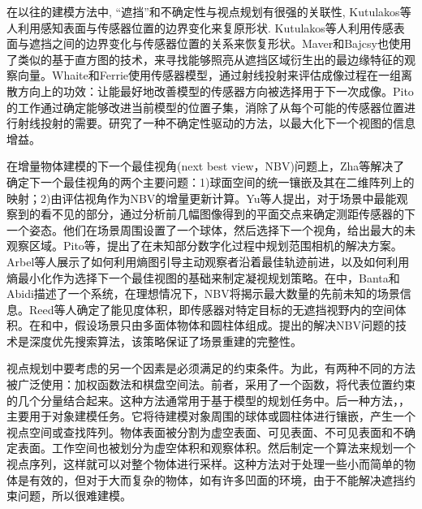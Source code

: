 \documentclass[AutoFakeBold,zihao=-4]{ctexart}
\begin{document}
	在以往的建模方法中, “遮挡”和不确定性与视点规划有很强的关联性, Kutulakos等人\cite{kutulakos1995global}利用感知表面与传感器位置的边界变化来复原形状. Kutulakos等人\cite{kutulakos1995global}利用传感表面与遮挡之间的边界变化与传感器位置的关系来恢复形状。Maver和Bajcsy\cite{maver1993occlusions}也使用了类似的基于直方图的技术，来寻找能够照亮从遮挡区域衍生出的最边缘特征的观察向量。Whaite和Ferrie\cite{whaite1997autonomous}使用传感器模型，通过射线投射来评估成像过程在一组离散方向上的功效：让能最好地改善模型的传感器方向被选择用于下一次成像。Pito\cite{pito1999solution}的工作通过确定能够改进当前模型的位置子集，消除了从每个可能的传感器位置进行射线投射的需要。研究了一种不确定性驱动的方法\cite{li2005information}，以最大化下一个视图的信息增益。
	
	在增量物体建模的下一个最佳视角(next best view，NBV)问题上，Zha等\cite{zha1997active}解决了确定下一个最佳视角的两个主要问题：1)球面空间的统一镶嵌及其在二维阵列上的映射；2)由评估视角作为NBV的增量更新计算。Yu等人\cite{zhien1996next}提出，对于场景中最能观察到的看不见的部分，通过分析前几幅图像得到的平面交点来确定测距传感器的下一个姿态。他们在场景周围设置了一个球体，然后选择下一个视角，给出最大的未观察区域。Pito等\cite{pito1999solution}，\cite{pito1996sensor}提出了在未知部分数字化过程中规划范围相机的解决方案。Arbel等人\cite{arbel1999viewpoint}展示了如何利用熵图引导主动观察者沿着最佳轨迹前进，以及如何利用熵最小化作为选择下一个最佳视图的基础来制定凝视规划策略。在\cite{banta1996autonomous}中，Banta和Abidi描述了一个系统，在理想情况下，NBV将揭示最大数量的先前未知的场景信息。Reed等人\cite{reed2000constraint}确定了能见度体积，即传感器对特定目标的无遮挡视野内的空间体积。在\cite{marchand1997active}和\cite{marchand1999active}中，假设场景只由多面体物体和圆柱体组成。提出的解决NBV问题的技术是深度优先搜索算法，该策略保证了场景重建的完整性。
	
	视点规划中要考虑的另一个因素是必须满足的约束条件。为此，有两种不同的方法被广泛使用：加权函数法和棋盘空间法。前者\cite{reed2000constraint}，\cite{tarabanis1995mvp,triggs1995automatic,gu1999robust,cowan1989determining,tarabanis1995survey}采用了一个函数，将代表位置约束的几个分量结合起来。这种方法通常用于基于模型的规划任务中\cite{trucco1997model}。后一种方法\cite{pito1999solution,li2005information,zha1997active}，\cite{morooka1999computations}，\cite{wong1999next}主要用于对象建模任务。它将待建模对象周围的球体或圆柱体进行镶嵌，产生一个视点空间或查找阵列\cite{morooka1999computations}。物体表面被分割为虚空表面、可见表面、不可见表面和不确定表面。工作空间也被划分为虚空体积和观察体积。然后制定一个算法来规划一个视点序列，这样就可以对整个物体进行采样。这种方法对于处理一些小而简单的物体是有效的，但对于大而复杂的物体，如有许多凹面的环境，由于不能解决遮挡约束问题，所以很难建模。
	
\end{document}
